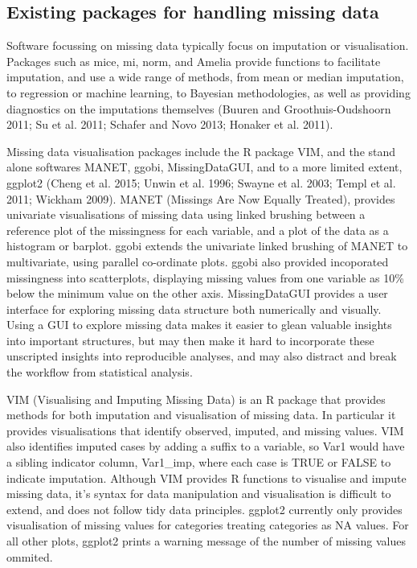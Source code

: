 \documentclass[]{article}
\begin{document}
\subsection{Existing packages for handling missing
data}\label{existing-packages-for-handling-missing-data}

Software focussing on missing data typically focus on imputation or
visualisation. Packages such as mice, mi, norm, and Amelia provide
functions to facilitate imputation, and use a wide range of methods,
from mean or median imputation, to regression or machine learning, to
Bayesian methodologies, as well as providing diagnostics on the
imputations themselves (Buuren and Groothuis-Oudshoorn 2011; Su et al.
2011; Schafer and Novo 2013; Honaker et al. 2011).

Missing data visualisation packages include the R package VIM, and the
stand alone softwares MANET, ggobi, MissingDataGUI, and to a more
limited extent, ggplot2 (Cheng et al. 2015; Unwin et al. 1996; Swayne et
al. 2003; Templ et al. 2011; Wickham 2009). MANET (Missings Are Now
Equally Treated), provides univariate visualisations of missing data
using linked brushing between a reference plot of the missingness for
each variable, and a plot of the data as a histogram or barplot. ggobi
extends the univariate linked brushing of MANET to multivariate, using
parallel co-ordinate plots. ggobi also provided incoporated missingness
into scatterplots, displaying missing values from one variable as 10\%
below the minimum value on the other axis. MissingDataGUI provides a
user interface for exploring missing data structure both numerically and
visually. Using a GUI to explore missing data makes it easier to glean
valuable insights into important structures, but may then make it hard
to incorporate these unscripted insights into reproducible analyses, and
may also distract and break the workflow from statistical analysis.

VIM (Visualising and Imputing Missing Data) is an R package that
provides methods for both imputation and visualisation of missing data.
In particular it provides visualisations that identify observed,
imputed, and missing values. VIM also identifies imputed cases by adding
a suffix to a variable, so Var1 would have a sibling indicator column,
Var1\_imp, where each case is TRUE or FALSE to indicate imputation.
Although VIM provides R functions to visualise and impute missing data,
it's syntax for data manipulation and visualisation is difficult to
extend, and does not follow tidy data principles. ggplot2 currently only
provides visualisation of missing values for categories treating
categories as NA values. For all other plots, ggplot2 prints a warning
message of the number of missing values ommited.
\end{document}
